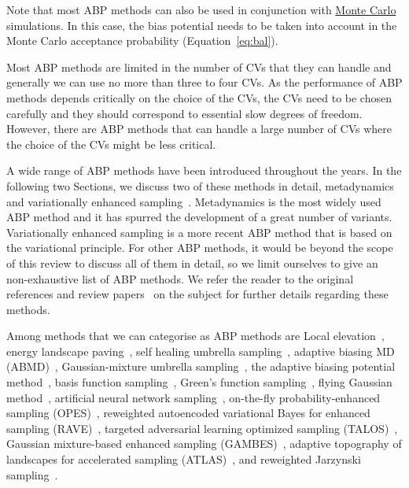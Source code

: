 \documentclass[9pt,review]{livecoms}
\begin{document}
Note that most ABP methods can also be used in conjunction with \hyperlink{ref:MetropolisMonteCarlo} {Monte Carlo} simulations. In this case, the bias potential needs to be taken into account in the Monte Carlo acceptance probability (Equation~\ref{eq:bal}).

Most ABP methods are limited in the number of CVs that they can handle and generally we can use no more than three to four CVs. As the performance of ABP methods depends critically on the choice of the CVs, the CVs need to be chosen carefully and they should correspond to essential slow degrees of freedom. However, there are ABP methods that can handle a large number of CVs where the choice of the CVs might be less critical.

A wide range of ABP methods have been introduced throughout the years. In the following two Sections, we discuss two of these methods in detail, metadynamics~\cite{Laio-PNAS-2002,Barducci-PRL-2008,Valsson2016_ARPC_MetaD} and variationally enhanced sampling~\cite{Valsson_VES_PRL_2014,Valsson2020Handbook_VES}. Metadynamics is the most widely used ABP method and it has spurred the development of a great number of variants. Variationally enhanced sampling is a more recent ABP method that is based on the variational principle. For other ABP methods, it would be beyond the scope of this review to discuss all of them in detail, so we limit ourselves to give an non-exhaustive list of ABP methods. We refer the reader to the original references and review papers~\cite{Dickson_ABP-Review_2017,Shalini_Review_2019,Allison_Review_2020} on the subject for further details regarding these methods.

Among methods that we can  categorise as ABP methods are
Local elevation~\cite{Huber1994},
energy landscape paving~\cite{Hansmann-PRL-2002},
self healing umbrella sampling~\cite{Marsili2006,Gersende_SelfHealing_2017},
adaptive biasing MD (ABMD)~\cite{Babin2008},
Gaussian-mixture umbrella sampling~\cite{Maragakis-JPCB-2009}, the adaptive biasing potential method~\cite{Dickson2010},
basis function sampling~\cite{Whitmer_BFS_2014}, Green's function sampling~\cite{Whitmer_GFS_2015}, flying Gaussian method~\cite{Sucur2016},
artificial neural network sampling~\cite{Sidky_ANNSampling_2018},
on-the-fly probability-enhanced sampling (OPES)~\cite{Invernizzi2020opus,invernizzi2020unified},
reweighted autoencoded variational Bayes for enhanced sampling (RAVE)~\cite{Tiwary_RAVE_2018},
targeted adversarial learning optimized sampling (TALOS)~\cite{Zhang_TALOS_2019},
Gaussian mixture-based enhanced sampling (GAMBES)~\cite{Debnath_GAMBES_2020},
adaptive topography of landscapes for accelerated sampling
(ATLAS)~\cite{giberti2021atlas},
and reweighted Jarzynski sampling~\cite{Bal_RewieghtedJarzynski_2021}.
\end{document}
